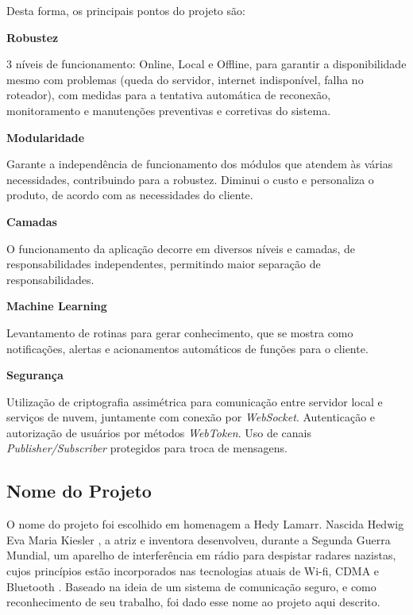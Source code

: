 Desta forma, os principais pontos do projeto são:

\begin{description}
\item \textbf{Robustez}

3 níveis de funcionamento: Online, Local e Offline, para garantir a disponibilidade mesmo com problemas (queda do servidor, internet indisponível, falha no roteador), com medidas para a tentativa automática de reconexão, monitoramento e manutenções preventivas e corretivas do sistema.

\item \textbf{Modularidade}

Garante a independência de funcionamento dos módulos que atendem às várias necessidades, contribuindo para a robustez. Diminui o custo e personaliza o produto, de acordo com as necessidades do cliente.

\item \textbf{Camadas}

O funcionamento da aplicação decorre em diversos níveis e camadas, de responsabilidades independentes, permitindo maior separação de responsabilidades.

\item \textbf{Machine Learning}

Levantamento de rotinas para gerar conhecimento, que se mostra como notificações, alertas e acionamentos automáticos de funções para o cliente.

\item \textbf{Segurança}

Utilização de criptografia assimétrica para comunicação entre servidor local e serviços de nuvem, juntamente com conexão por \textit{WebSocket}. Autenticação e autorização de usuários por métodos \textit{WebToken}. Uso de canais \textit{Publisher/Subscriber} protegidos para troca de mensagens.

\end{description}

\subsection{Nome do Projeto}
O nome do projeto foi escolhido em homenagem a Hedy Lamarr. Nascida Hedwig Eva Maria Kiesler \cite{shearer}, a atriz e inventora desenvolveu, durante a Segunda Guerra Mundial, um aparelho de interferência em rádio para despistar radares nazistas, cujos princípios estão incorporados nas tecnologias atuais de Wi-fi, CDMA e Bluetooth \cite{electronicFrontier}. Baseado na ideia de um sistema de comunicação seguro, e como reconhecimento de seu trabalho, foi dado esse nome ao projeto aqui descrito.

